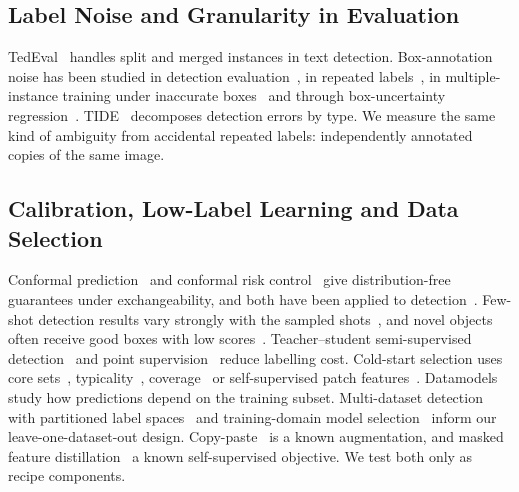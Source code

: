 \subsection{Label Noise and Granularity in Evaluation}
TedEval~\cite{tedeval} handles split and merged instances in text detection. Box-annotation noise has been studied in detection evaluation~\cite{murrugarra}, in repeated labels~\cite{tschirschwitz}, in multiple-instance training under inaccurate boxes~\cite{oamil} and through box-uncertainty regression~\cite{klloss}. TIDE~\cite{tide} decomposes detection errors by type. We measure the same kind of ambiguity from accidental repeated labels: independently annotated copies of the same image.

\subsection{Calibration, Low-Label Learning and Data Selection}
Conformal prediction~\cite{vovk} and conformal risk control~\cite{crc} give distribution-free guarantees under exchangeability, and both have been applied to detection~\cite{andeol}. Few-shot detection results vary strongly with the sampled shots~\cite{tfa}, and novel objects often receive good boxes with low scores~\cite{attentionrpn}. Teacher--student semi-supervised detection~\cite{meanteacher,unbiasedteacher,softteacher} and point supervision~\cite{pointdetr} reduce labelling cost. Cold-start selection uses core sets~\cite{coreset}, typicality~\cite{typiclust}, coverage~\cite{probcover} or self-supervised patch features~\cite{freesel}. Datamodels~\cite{datamodels} study how predictions depend on the training subset. Multi-dataset detection with partitioned label spaces~\cite{multidataset} and training-domain model selection~\cite{domainbed} inform our leave-one-dataset-out design. Copy-paste~\cite{copypaste} is a known augmentation, and masked feature distillation~\cite{data2vec} a known self-supervised objective. We test both only as recipe components.
